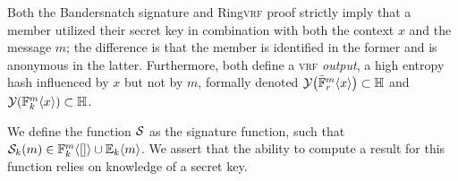 Both the Bandersnatch signature and Ring\textsc{vrf} proof strictly imply that a member utilized their secret key in combination with both the context $x$ and the message $m$; the difference is that the member is identified in the former and is anonymous in the latter. Furthermore, both define a \textsc{vrf} \emph{output}, a high entropy hash influenced by $x$ but not by $m$, formally denoted $\Fbanderout{\bandersnatch{r}{x}{m}} \subset \hash$ and $\Fbanderout{\bandersig{k}{x}{m}} \subset \hash$.

We define the function $\mathcal{S}$ as the signature function, such that $\signdata_{k}(m) \in \bandersig{k}{[]}{m} \cup \sig{k}{m}$. We assert that the ability to compute a result for this function relies on knowledge of a secret key.
